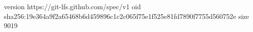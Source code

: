 version https://git-lfs.github.com/spec/v1
oid sha256:19e364a9f2a65468b6d459896c1c2c065f75e1f525e81fd7890f7755d560752e
size 9019
